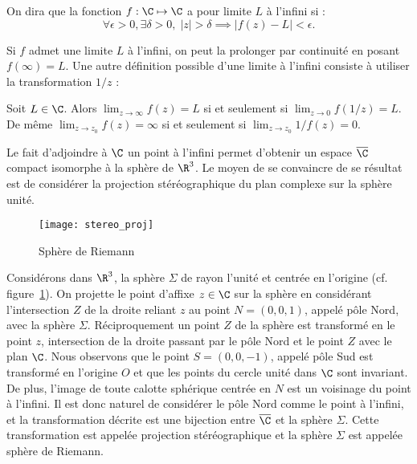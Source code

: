 \begin{fdefn}
On dira que la fonction $f : \C \mapsto \C$ a pour limite $L$ à l'infini si : 
\[\forall \epsilon >0, \exists \delta >0, \;  \lvert z \rvert > \delta \implies \lvert f(z)-L \rvert < \epsilon.\]
\end{fdefn}
Si $f$ admet une limite $L$ à l'infini, on peut la prolonger par continuité en posant $f(\infty)=L$. Une autre définition possible d'une limite à l'infini consiste à utiliser la transformation $1/z$ :

\begin{prop}
Soit $L \in \C$. Alors $\lim_{z \rightarrow \infty} f(z)= L$ si et seulement si $\lim_{z \rightarrow 0} f(1/z)= L$. De même $\lim_{z \rightarrow z_0} f(z)= \infty$ si et seulement si $\lim_{z \rightarrow z_0} 1/f(z)= 0$.
\end{prop}







Le fait d'adjoindre à $\C$ un point à l'infini permet d'obtenir un espace  $\overline{\C}$ compact isomorphe à la sphère de $\R^3$. Le moyen de se convaincre de se résultat est de considérer la projection stéréographique du plan complexe sur la sphère unité.  

\begin{figure}
\label{fig:sphereRiemann}
\begin{center}\texttt{[image: stereo\_proj]}
\end{center}
\caption{Sphère de Riemann}
\end{figure}

Considérons dans $\R^3$, la sphère $\Sigma$ de rayon l'unité et centrée en l'origine (cf. figure~\ref{fig:sphereRiemann}). On projette le point d'affixe $z \in \C$ sur la sphère en considérant l'intersection $Z$ de la droite reliant $z$ au point $N=(0,0,1)$, appelé pôle Nord, avec la sphère $\Sigma$. Réciproquement un point $Z$ de la sphère est transformé en le point $z$, intersection de la droite passant par le pôle Nord et le point $Z$ avec le plan $\C$. Nous observons que le point $S=(0,0,-1)$, appelé pôle Sud est transformé en l'origine $O$ et que les points du cercle unité dans $\C$ sont invariant. De plus, l'image de toute calotte sphérique centrée en $N$ est un voisinage du point à l'infini. Il est donc naturel de considérer le pôle Nord comme le point à l'infini, et la transformation décrite est une bijection entre $\overline{\C}$ et la sphère $\Sigma$. Cette transformation est appelée projection stéréographique et la sphère $\Sigma$ est appelée sphère de Riemann. 

